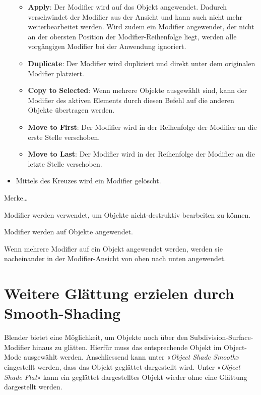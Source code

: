 \documentclass[
]{book}
\providecommand{\tightlist}{%
  \setlength{\itemsep}{0pt}\setlength{\parskip}{0pt}}\usepackage{longtable,booktabs,array}
\let\oldmarginnote\marginnote
\renewcommand{\marginnote}[1]{%
  \oldmarginnote{{\footnotesize\selectfont #1}}%
}
\begin{document}
\begin{itemize}
  \begin{itemize}
  \tightlist
  \item
    \textbf{Apply}: Der Modifier wird auf das Objekt angewendet. Dadurch
    verschwindet der Modifier aus der Ansicht und kann auch nicht mehr
    weiterbearbeitet werden. Wird zudem ein Modifier angewendet, der
    nicht an der obersten Position der Modifier-Reihenfolge liegt,
    werden alle vorgängigen Modifier bei der Anwendung ignoriert.
  \item
    \textbf{Duplicate}: Der Modifier wird dupliziert und direkt unter
    dem originalen Modifier platziert.
  \item
    \textbf{Copy to Selected}: Wenn mehrere Objekte ausgewählt sind,
    kann der Modifier des aktiven Elements durch diesen Befehl auf die
    anderen Objekte übertragen werden.
  \item
    \textbf{Move to First}: Der Modifier wird in der Reihenfolge der
    Modifier an die erste Stelle verschoben.
  \item
    \textbf{Move to Last}: Der Modifier wird in der Reihenfolge der
    Modifier an die letzte Stelle verschoben.
  \end{itemize}
\item
  Mittels des Kreuzes wird ein Modifier gelöscht.
\end{itemize}

Merke\ldots{}

Modifier werden verwendet, um Objekte nicht-destruktiv bearbeiten zu
können.

Modifier werden auf Objekte angewendet.

Wenn mehrere Modifier auf ein Objekt angewendet werden, werden sie
nacheinander in der Modifier-Ansicht von oben nach unten angewendet.

\section{Weitere Glättung erzielen durch
Smooth-Shading}\label{weitere-gluxe4ttung-erzielen-durch-smooth-shading}

\marginnote{Shade Smooth und Shade Flat}

Blender bietet eine Möglichkeit, um Objekte noch über den
Subdivision-Surface-Modifier hinaus zu glätten. Hierfür muss das
entsprechende Objekt im Object-Mode ausgewählt werden. Anschliessend
kann unter «\emph{Object \textbar{} Shade Smooth}» eingestellt werden,
dass das Objekt geglättet dargestellt wird. Unter «\emph{Object
\textbar{} Shade Flat}» kann ein geglättet dargestelltes Objekt wieder
ohne eine Glättung dargestellt werden.
\end{document}
